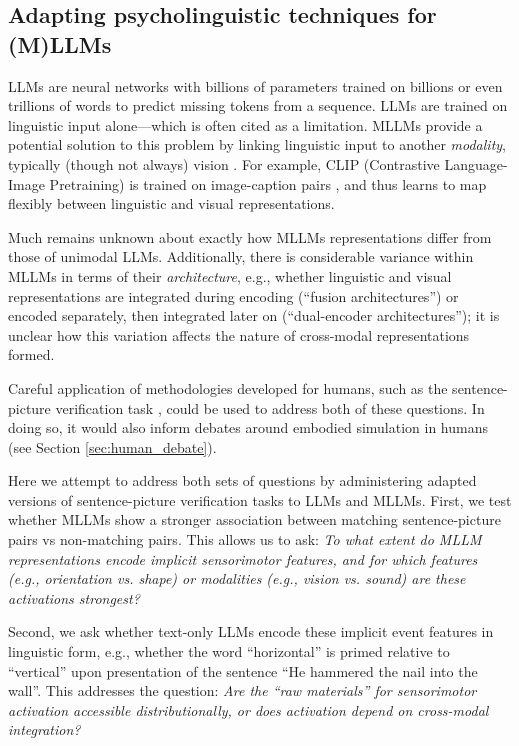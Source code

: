 \documentclass[11pt]{article}
\begin{document}
\subsection{Adapting psycholinguistic techniques for (M)LLMs}

LLMs are neural networks with billions of parameters trained on billions or even trillions of words to predict missing tokens from a sequence. LLMs are trained on linguistic input alone---which is often cited as a limitation. MLLMs provide a potential solution to this problem by linking linguistic input to another \textit{modality}, typically (though not always) vision \cite{driess2023palm, girdhar2023imagebind, huang2023language}. For example, CLIP (Contrastive Language-Image Pretraining) is trained on image-caption pairs \cite{radfordLearningTransferableVisual2021a}, and thus learns to map flexibly between linguistic and visual representations. 

Much remains unknown about exactly how MLLMs representations differ from those of unimodal LLMs. Additionally, there is considerable variance within MLLMs in terms of their \textit{architecture}, e.g., whether linguistic and visual representations are integrated during encoding (``fusion architectures'') or encoded separately, then integrated later on (``dual-encoder architectures''); it is unclear how this variation affects the nature of cross-modal representations formed.

Careful application of methodologies developed for humans, such as the sentence-picture verification task \cite{stanfield2001effect, zwaan2002language}, could be used to address both of these questions. In doing so, it would also inform debates around embodied simulation in humans (see Section \ref{sec:human_debate}).

Here we attempt to address both sets of questions by administering adapted versions of sentence-picture verification tasks to LLMs and MLLMs.
First, we test whether MLLMs show a stronger association between matching sentence-picture pairs vs non-matching pairs. This allows us to ask: \textit{To what extent do MLLM representations encode implicit sensorimotor features, and for which features (e.g., orientation vs. shape) or modalities (e.g., vision vs. sound) are these activations strongest?}

Second, we ask whether text-only LLMs encode these implicit event features in linguistic form, e.g., whether the word ``horizontal'' is primed relative to ``vertical'' upon presentation of the sentence ``He hammered the nail into the wall''. This addresses the question: \textit{Are the ``raw materials'' for sensorimotor activation accessible distributionally, or does activation depend on cross-modal integration?}
\end{document}
